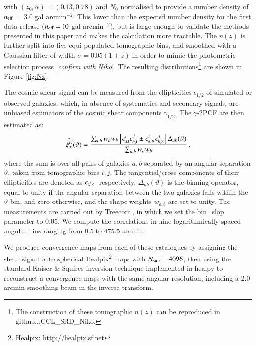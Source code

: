 \documentclass[useAMS,usenatbib]{mn2e}
\begin{document}
with $(z_0, \alpha) = (0.13, 0.78)$ and $N_0$ normalised to provide a number density of $n_{\rm eff}$ = 3.0 gal arcmin$^{-2}$. This lower than the expected number density for the first data release ($n_{\rm eff}=10$ gal arcmin$^{-2}$), but is large enough to validate the methods presented in this paper and makes the calculation more tractable. The $n(z)$ is further split into five equi-populated tomographic bins, and smoothed with a Gaussian filter of width $\sigma = 0.05(1+z)$ in order to mimic the photometric selection process [{\it confirm with Niko}].  The resulting distributions\footnote{The construction of these tomographic $n(z)$ can be reproduced in {github...CCL\_SRD\_Niko}.} are shown in Figure \ref{fig:Nz}. 

The cosmic shear signal can be measured from the ellipticities $\epsilon_{1/2}$ of simulated or observed galaxies, which, in absence of systematics and secondary signals, are unbiased estimators  of the cosmic shear components $\gamma_{1/2}$. The $\gamma$-2PCF are then estimated as:
 \begin{eqnarray}
 \widehat{\xi_{\pm}^{ij}}(\vartheta) = \frac{\sum_{a,b} w_a w_b \left[\epsilon_{a, \rm t}^i\epsilon_{b, \rm t}^j     \pm \epsilon_{a, \times}^i\epsilon_{b, \times}^j    \right]\Delta_{ab}(\vartheta)}{\sum_{a,b} w_a w_b} \, ,
 \label{eq:2PCF_estimator}
  \end{eqnarray}
where the sum is over all pairs of galaxies $a,b$ separated by an angular separation $\vartheta$, taken from tomographic bins $i,j$. The tangential/cross components of their ellipticities are denoted as $\epsilon_{\rm t/\times}$, respectively. 
$\Delta_{ab}(\vartheta)$ is the binning operator, equal to unity if the angular separation between the two galaxies falls within the $\vartheta$-bin, and zero otherwise, and the shape weights $w_{a,b}$ are set to unity. The measurements are carried out by {\sc Treecorr} \citep{TreeCorr}, in which we set the {\sc bin\_slop} parameter to 0.05. We compute the correlations in nine logarithmically-spaced angular bins ranging from 0.5 to 475.5 arcmin. 
 
We  produce convergence maps from each of these catalogues by assigning the shear signal onto spherical {\sc Healpix}\footnote{{\sc Healpix}: http://healpix.sf.net}  maps \citep{healpix} with $N_{\rm side}=4096$, then using the standard Kaiser \& Squires inversion technique \citep{KaiserSquires} implemented in {\sc healpy} to reconstruct a convergence maps with the same angular resolution, including a 2.0 arcmin smoothing beam in the inverse transform.
 
\end{document}
